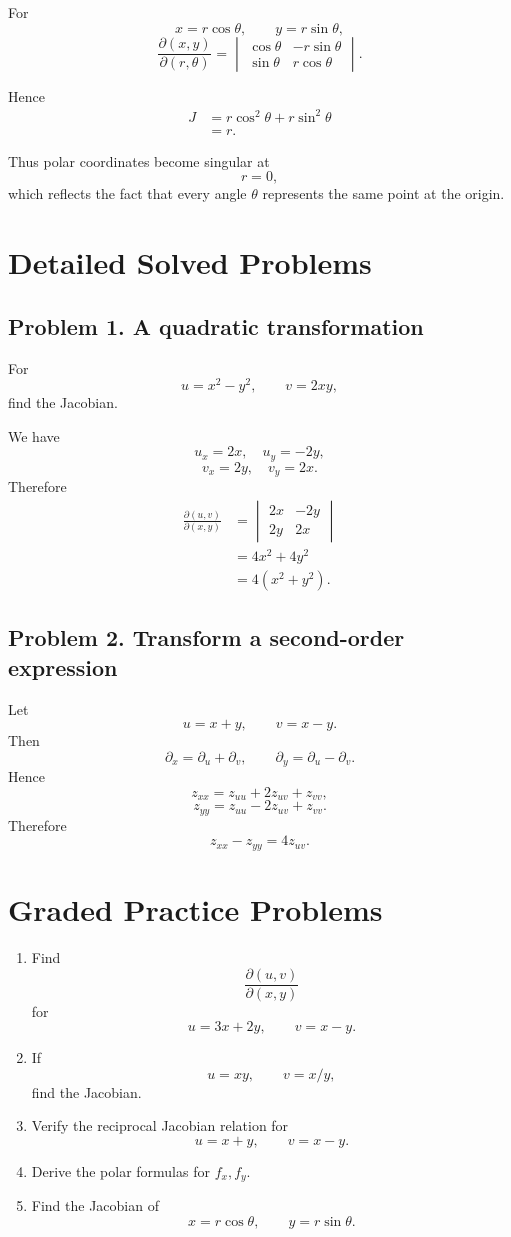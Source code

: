 \documentclass[11pt,oneside]{book}
\theoremstyle{studentthm}
\theoremstyle{definition}
\begin{document}
For
\[
x=r\cos\theta,\qquad y=r\sin\theta,
\]
\[
\frac{\partial(x,y)}{\partial(r,\theta)}
=
\begin{vmatrix}
\cos\theta&-r\sin\theta\\
\sin\theta&r\cos\theta
\end{vmatrix}.
\]

Hence
\[
\begin{aligned}
J
&=
r\cos^2\theta+r\sin^2\theta\\
&=
r.
\end{aligned}
\]

Thus polar coordinates become singular at
\[
r=0,
\]
which reflects the fact that every angle \(\theta\) represents the same
point at the origin.


\section{Detailed Solved Problems}

\subsection*{Problem 1. A quadratic transformation}
For
\[
u=x^2-y^2,
\qquad
v=2xy,
\]
find the Jacobian.

We have
\[
u_x=2x,\quad u_y=-2y,
\]
\[
v_x=2y,\quad v_y=2x.
\]
Therefore
\[
\begin{aligned}
\frac{\partial(u,v)}{\partial(x,y)}
&=
\begin{vmatrix}
2x&-2y\\
2y&2x
\end{vmatrix}\\
&=
4x^2+4y^2\\
&=
4(x^2+y^2).
\end{aligned}
\]

\subsection*{Problem 2. Transform a second-order expression}
Let
\[
u=x+y,\qquad v=x-y.
\]
Then
\[
\partial_x=\partial_u+\partial_v,
\qquad
\partial_y=\partial_u-\partial_v.
\]
Hence
\[
z_{xx}
=
z_{uu}+2z_{uv}+z_{vv},
\]
\[
z_{yy}
=
z_{uu}-2z_{uv}+z_{vv}.
\]
Therefore
\[
z_{xx}-z_{yy}=4z_{uv}.
\]

\section{Graded Practice Problems}
\begin{enumerate}
\item Find
\[
\frac{\partial(u,v)}{\partial(x,y)}
\]
for
\[
u=3x+2y,\qquad v=x-y.
\]
\item If
\[
u=xy,\qquad v=x/y,
\]
find the Jacobian.
\item Verify the reciprocal Jacobian relation for
\[
u=x+y,\qquad v=x-y.
\]
\item Derive the polar formulas for \(f_x,f_y\).
\item Find the Jacobian of
\[
x=r\cos\theta,\qquad y=r\sin\theta.
\]
\end{enumerate}
\end{document}

